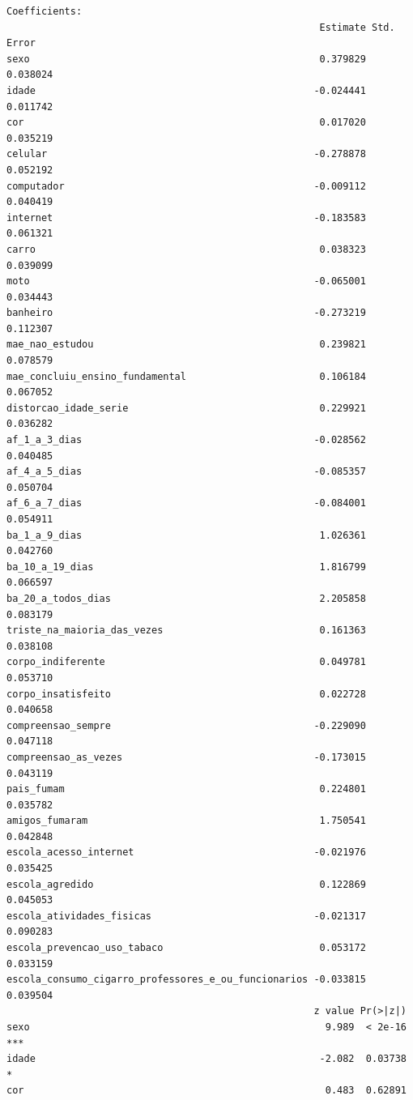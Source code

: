 \documentclass[
]{article}
\begin{document}
\begin{verbatim}
Coefficients:
                                                      Estimate Std. Error
sexo                                                  0.379829   0.038024
idade                                                -0.024441   0.011742
cor                                                   0.017020   0.035219
celular                                              -0.278878   0.052192
computador                                           -0.009112   0.040419
internet                                             -0.183583   0.061321
carro                                                 0.038323   0.039099
moto                                                 -0.065001   0.034443
banheiro                                             -0.273219   0.112307
mae_nao_estudou                                       0.239821   0.078579
mae_concluiu_ensino_fundamental                       0.106184   0.067052
distorcao_idade_serie                                 0.229921   0.036282
af_1_a_3_dias                                        -0.028562   0.040485
af_4_a_5_dias                                        -0.085357   0.050704
af_6_a_7_dias                                        -0.084001   0.054911
ba_1_a_9_dias                                         1.026361   0.042760
ba_10_a_19_dias                                       1.816799   0.066597
ba_20_a_todos_dias                                    2.205858   0.083179
triste_na_maioria_das_vezes                           0.161363   0.038108
corpo_indiferente                                     0.049781   0.053710
corpo_insatisfeito                                    0.022728   0.040658
compreensao_sempre                                   -0.229090   0.047118
compreensao_as_vezes                                 -0.173015   0.043119
pais_fumam                                            0.224801   0.035782
amigos_fumaram                                        1.750541   0.042848
escola_acesso_internet                               -0.021976   0.035425
escola_agredido                                       0.122869   0.045053
escola_atividades_fisicas                            -0.021317   0.090283
escola_prevencao_uso_tabaco                           0.053172   0.033159
escola_consumo_cigarro_professores_e_ou_funcionarios -0.033815   0.039504
                                                     z value Pr(>|z|)    
sexo                                                   9.989  < 2e-16 ***
idade                                                 -2.082  0.03738 *  
cor                                                    0.483  0.62891    

\end{verbatim}
\end{document}
